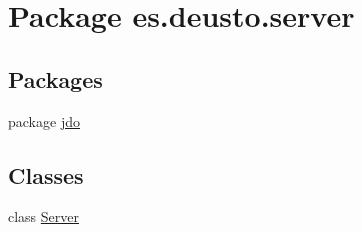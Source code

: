 \hypertarget{namespacees_1_1deusto_1_1server}{}\section{Package es.\+deusto.\+server}
\label{namespacees_1_1deusto_1_1server}
\subsection*{Packages}
\begin{DoxyCompactItemize}
\item 
package \mbox{\hyperlink{namespacees_1_1deusto_1_1server_1_1jdo}{jdo}}
\end{DoxyCompactItemize}
\subsection*{Classes}
\begin{DoxyCompactItemize}
\item 
class \mbox{\hyperlink{classes_1_1deusto_1_1server_1_1_server}{Server}}
\end{DoxyCompactItemize}
